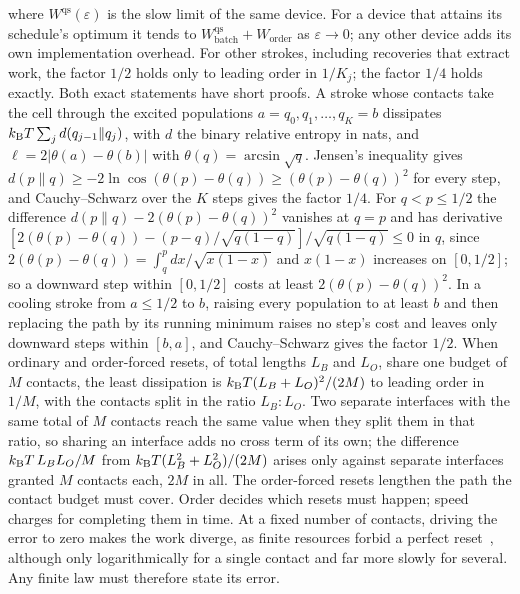 where $W^{\mathrm{qs}}(\varepsilon)$ is the slow limit of the same device. For a device that attains its schedule's optimum it tends to $W^{\mathrm{qs}}_{\mathrm{batch}}+W_{\mathrm{order}}$ as $\varepsilon\to0$; any other device adds its own implementation overhead. For other strokes, including recoveries that extract work, the factor $1/2$ holds only to leading order in $1/K_j$; the factor $1/4$ holds exactly. Both exact statements have short proofs. A stroke whose contacts take the cell through the excited populations $a=q_0,q_1,\dots,q_K=b$ dissipates $k_{\mathrm B} T\sum_jd(q_{j-1}\|q_j)$, with $d$ the binary relative entropy in nats, and $\ell=2|\theta(a)-\theta(b)|$ with $\theta(q)=\arcsin\sqrt q$. Jensen's inequality gives $d(p\|q)\ge-2\ln\cos(\theta(p)-\theta(q))\ge(\theta(p)-\theta(q))^2$ for every step, and Cauchy--Schwarz over the $K$ steps gives the factor $1/4$. For $q<p\le1/2$ the difference $d(p\|q)-2(\theta(p)-\theta(q))^2$ vanishes at $q=p$ and has derivative $[2(\theta(p)-\theta(q))-(p-q)/\sqrt{q(1-q)}]/\sqrt{q(1-q)}\le0$ in $q$, since $2(\theta(p)-\theta(q))=\int_q^p dx/\sqrt{x(1-x)}$ and $x(1-x)$ increases on $[0,1/2]$; so a downward step within $[0,1/2]$ costs at least $2(\theta(p)-\theta(q))^2$. In a cooling stroke from $a\le1/2$ to $b$, raising every population to at least $b$ and then replacing the path by its running minimum raises no step's cost and leaves only downward steps within $[b,a]$, and Cauchy--Schwarz gives the factor $1/2$. When ordinary and order-forced resets, of total lengths $L_B$ and $L_O$, share one budget of $M$ contacts, the least dissipation is $k_{\mathrm B} T(L_B+L_O)^2/(2M)$ to leading order in $1/M$, with the contacts split in the ratio $L_B:L_O$. Two separate interfaces with the same total of $M$ contacts reach the same value when they split them in that ratio, so sharing an interface adds no cross term of its own; the difference $k_{\mathrm B} T\,L_BL_O/M$ from $k_{\mathrm B} T(L_B^2+L_O^2)/(2M)$ arises only against separate interfaces granted $M$ contacts each, $2M$ in all. The order-forced resets lengthen the path the contact budget must cover. Order decides which resets must happen; speed charges for completing them in time. At a fixed number of contacts, driving the error to zero makes the work diverge, as finite resources forbid a perfect reset~\cite{ReebWolf14,Taranto23}, although only logarithmically for a single contact and far more slowly for several. Any finite law must therefore state its error.

